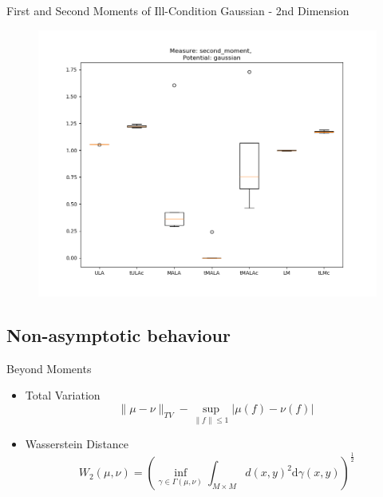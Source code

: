 \documentclass[aspectratio=169]{beamer}
\begin{document}
\begin{frame}{First and Second Moments of Ill-Condition Gaussian - 2nd Dimension}%
        \begin{figure}[h]
        \centering
        \begin{minipage}{0.7\linewidth}
          \centering
          \includegraphics[width=0.99\linewidth]{illcond10sBoxPlot2moment100dim01step2nddimnotula.png}
        \end{minipage}%
        \end{figure}
\end{frame}



\subsection{Non-asymptotic behaviour}
\begin{frame}{Beyond Moments}
\begin{itemize}
    \item Total Variation
        \[\|\mu-\nu\|_{TV} - \sup_{\|f\|\leq 1} |\mu(f) - \nu(f)|\ \]
    \item Wasserstein Distance
       \[W_2(\mu,\nu) = \left( \inf_{\gamma \in \Gamma(\mu,\nu)} \int_{M\times M} d(x,y)^2 \mathrm{d}\gamma(x,y)\right)^{\frac{1}{2}}\]
\end{itemize}

\end{frame}
\end{document}
